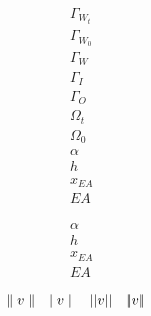 \documentclass[12pt,notitlepage]{report}
\begin{document}


\huge{
\[
\begin{split}
&\Gamma_{W_t}\\
&\Gamma_{W_0}\\
&\Gamma_W\\
&\Gamma_I\\
&\Gamma_O\\
&\Omega_t\\
&\Omega_0\\
&\alpha\\
&h\\
&x_{EA}\\
&EA
\end{split}
\]
}

\large{
\[
\begin{split}
&\alpha\\
&h\\
&x_{EA}\\
&EA
\end{split}
\]
}

\[
\parallel v \parallel \quad
\mid v \mid \quad
||v|| \quad
|\!| v|\!|
\]
\end{document}
